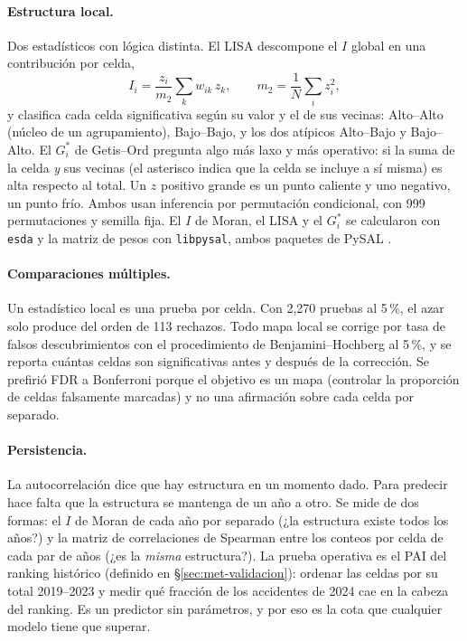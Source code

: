 \paragraph{Estructura local.} Dos estadísticos con lógica distinta. El LISA
\parencite{anselin1995lisa} descompone el $I$ global en una contribución por
celda,
\begin{equation}
	I_i = \frac{z_i}{m_2} \sum_k w_{ik}\, z_k,
	\qquad m_2 = \frac{1}{N}\sum_i z_i^2,
\end{equation}
y clasifica cada celda significativa según su valor y el de sus vecinas:
Alto--Alto (núcleo de un agrupamiento), Bajo--Bajo, y los dos atípicos
Alto--Bajo y Bajo--Alto. El $G_i^*$ de Getis--Ord
\parencite{getis1992analysis,ord1995local} pregunta algo más laxo y más
operativo: si la suma de la celda \emph{y} sus vecinas (el asterisco indica
que la celda se incluye a sí misma) es alta respecto al total. Un $z$
positivo grande es un punto caliente y uno negativo, un punto frío. Ambos usan
inferencia por permutación condicional, con 999 permutaciones y semilla fija.
El $I$ de Moran, el LISA y el $G_i^*$ se calcularon con \texttt{esda} y la
matriz de pesos con \texttt{libpysal}, ambos paquetes de PySAL
\parencite{rey2007pysal,rey2022pysal}.

\paragraph{Comparaciones múltiples.} Un estadístico local es una prueba por
celda. Con 2,270 pruebas al 5\,\%, el azar solo produce del orden de 113
rechazos. Todo mapa local se corrige por tasa de falsos descubrimientos con
el procedimiento de Benjamini--Hochberg \parencite{benjamini1995fdr} al 5\,\%, y
se reporta cuántas celdas son significativas antes y después de la
corrección. Se prefirió FDR a Bonferroni porque el objetivo es un mapa
(controlar la proporción de celdas falsamente marcadas) y no una afirmación
sobre cada celda por separado.

\paragraph{Persistencia.} La autocorrelación dice que hay estructura en un
momento dado. Para predecir hace falta que la estructura se mantenga de un
año a otro. Se mide de dos formas: el $I$ de Moran de cada año por separado
(¿la estructura existe todos los años?) y la matriz de correlaciones de
Spearman entre los conteos por celda de cada par de años (¿es la
\emph{misma} estructura?). La prueba operativa es el PAI del ranking
histórico (definido en §\ref{sec:met-validacion}): ordenar las celdas por
su total 2019--2023 y medir qué fracción de los accidentes de 2024 cae en
la cabeza del ranking. Es un predictor sin parámetros, y por eso es la cota
que cualquier modelo tiene que superar.

